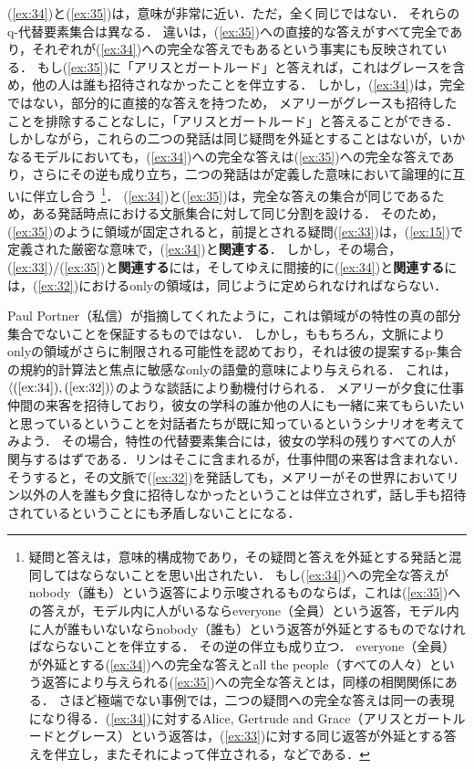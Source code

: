 \documentclass{goken}
\newcommand{\ori}[1]{\noindent\textcolor[gray]{0.7}{\fontsize{8pt}{8pt}\selectfont{\textsf{(p.~#1)}}} }
\begin{document}
\noindent
(\ref{ex:34})と(\ref{ex:35})は，意味が非常に近い．ただ，全く同じではない．
それらのq-代替要素集合は異なる．
違いは，(\ref{ex:35})への直接的な答えがすべて完全であり，それぞれが(\ref{ex:34})への完全な答えでもあるという事実にも反映されている．
もし(\ref{ex:35})に「アリスとガートルード」と答えれば，これはグレースを含め，他の人は誰も招待されなかったことを伴立する．
しかし，(\ref{ex:34})は，完全ではない，部分的に直接的な答えを持つため，\ori{41}メアリーがグレースも招待したことを排除することなしに，「アリスとガートルード」と答えることができる．
しかしながら，これらの二つの発話は同じ疑問を外延とすることはないが，いかなるモデルにおいても，(\ref{ex:34})への完全な答えは(\ref{ex:35})への完全な答えであり，さらにその逆も成り立ち，二つの発話は\cite{GroenendijkStokhof1984}が定義した意味において論理的に互いに伴立し合う
\footnote{%
  疑問と答えは，意味的構成物であり，その疑問と答えを外延とする発話と混同してはならないことを思い出されたい．
  もし(\ref{ex:34})への完全な答えがnobody（誰も）という返答により示唆されるものならば，これは(\ref{ex:35})への答えが，モデル内に人がいるならeveryone（全員）という返答，モデル内に人が誰もいないならnobody（誰も）という返答が外延とするものでなければならないことを伴立する．
  その逆の伴立も成り立つ．
  everyone（全員）が外延とする(\ref{ex:34})への完全な答えとall the people（すべての人々）という返答により与えられる(\ref{ex:35})への完全な答えとは，同様の相関関係にある．
  さほど極端でない事例では，二つの疑問への完全な答えは同一の表現になり得る．(\ref{ex:34})に対するAlice, Gertrude and Grace（アリスとガートルードとグレース）という返答は，(\ref{ex:33})に対する同じ返答が外延とする答えを伴立し，またそれによって伴立される，などである．
}．
(\ref{ex:34})と(\ref{ex:35})は，完全な答えの集合が同じであるため，ある発話時点における文脈集合に対して同じ分割を設ける．
そのため，(\ref{ex:35})のように領域が固定されると，前提とされる疑問(\ref{ex:33})は，(\ref{ex:15})で定義された厳密な意味で，(\ref{ex:34})と\textbf{関連する}．
しかし，その場合，(\ref{ex:33})/(\ref{ex:35})と\textbf{関連する}には，そしてゆえに間接的に(\ref{ex:34})と\textbf{関連する}には，(\ref{ex:32})におけるonlyの領域は，同じように定められなければならない．

Paul Portner（私信）が指摘してくれたように，これは領域が\citeauthor{Rooth1985}の特性の真の部分集合でないことを保証するものではない．
しかし，\citeauthor{Rooth1985}ももちろん，文脈によりonlyの領域がさらに制限される可能性を認めており，それは彼の提案するp-集合の規約的計算法と焦点に敏感なonlyの語彙的意味により与えられる．
これは，$\langle(\ref{ex:34}), (\ref{ex:32})\rangle$のような談話により動機付けられる．
メアリーが夕食に仕事仲間の来客を招待しており，彼女の学科の誰か他の人にも一緒に来てもらいたいと思っているということを対話者たちが既に知っているというシナリオを考えてみよう．
その場合，特性の代替要素集合には，彼女の学科の残りすべての人が関与するはずである．リンはそこに含まれるが，仕事仲間の来客は含まれない．
そうすると，その文脈で(\ref{ex:32})を発話しても，メアリーがその世界においてリン以外の人を誰も夕食に招待しなかったということは伴立されず，話し手も招待されているということにも矛盾しないことになる．
\end{document}
